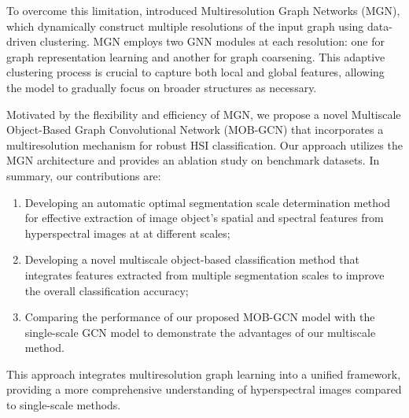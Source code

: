 To overcome this limitation, \citet{Hy_2023} introduced Multiresolution Graph Networks (MGN), which dynamically construct multiple resolutions of the input graph using data-driven clustering. MGN employs two GNN modules at each resolution: one for graph representation learning and another for graph coarsening. This adaptive clustering process is crucial to capture both local and global features, allowing the model to gradually focus on broader structures as necessary.

Motivated by the flexibility and efficiency of MGN, we propose a novel Multiscale Object-Based Graph Convolutional Network (MOB-GCN) that incorporates a multiresolution mechanism for robust HSI classification. Our approach utilizes the MGN architecture and provides an ablation study on benchmark datasets. In summary, our contributions are:
\begin{enumerate} 
    \item Developing an automatic optimal segmentation scale determination method for effective extraction of image object's spatial and spectral features from hyperspectral images at at different scales;
    \item Developing a novel multiscale object-based classification method that integrates features extracted from multiple segmentation scales to improve the overall classification accuracy;
    \item Comparing the performance of our proposed MOB-GCN model with the single-scale GCN model to demonstrate the advantages of our multiscale method.
\end{enumerate}


This approach integrates multiresolution graph learning into a unified framework, providing a more comprehensive understanding of hyperspectral images compared to single-scale methods.

